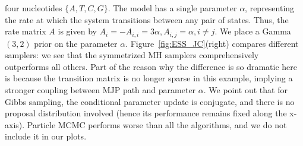   four nucleotides $\{A, T, C, G\}$.  The model has a single parameter $\alpha$, 
  representing the rate at which the system transitions between any pair of 
  states. Thus, the rate matrix $A$ is given by 
$A_i = -A_{i,i} = 3\alpha, A_{i, j} = \alpha,i \neq j.$
We place a Gamma$(3,2)$ prior on the parameter $\alpha$.
Figure~\ref{fig:ESS_JC}(right) compares different samplers: we see that the
symmetrized MH samplers comprehensively outperforms all others.
Part of the reason why the difference is so dramatic here is because the
transition matrix is no longer sparse in this example, implying a stronger
coupling between MJP path and parameter $\alpha$. We point out that for Gibbs
sampling, the conditional parameter update is conjugate, and there is no
proposal distribution involved (hence its performance remains fixed along
the x-axis). Particle MCMC performs worse
than all the algorithms, and we do not include it in our plots.
